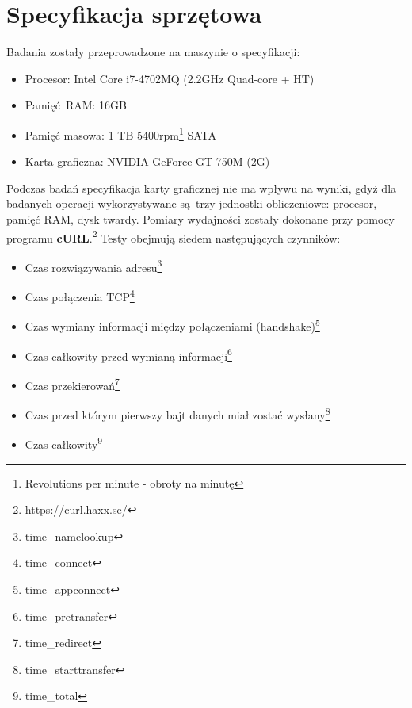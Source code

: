 \section{Specyfikacja sprzętowa}
Badania zostały przeprowadzone na maszynie o specyfikacji:
\begin{itemize}
	\item Procesor: Intel Core i7-4702MQ (2.2GHz Quad-core + HT) 
	\item Pamięć RAM: 16GB
	\item Pamięć masowa: 1 TB 5400rpm\footnote{Revolutions per minute - obroty na minutę} SATA
	\item Karta graficzna: NVIDIA GeForce GT 750M (2G)  
\end{itemize}
Podczas badań specyfikacja karty graficznej nie ma wpływu na wyniki, gdyż dla badanych operacji wykorzystywane są trzy jednostki obliczeniowe: procesor, pamięć RAM, dysk twardy.
\newline Pomiary wydajności zostały dokonane przy pomocy programu \textbf{cURL}.\footnote{\url{https://curl.haxx.se/}} Testy obejmują siedem następujących czynników:
\begin{itemize}\label{items:time-descriptions}
	\item{Czas rozwiązywania adresu\footnote{time\_namelookup}}
	\item{Czas połączenia TCP\footnote{time\_connect}}
	\item{Czas wymiany informacji między połączeniami (handshake)\footnote{time\_appconnect}} 
	\item{Czas całkowity przed wymianą informacji\footnote{time\_pretransfer}}
	\item{Czas przekierowań\footnote{time\_redirect}}
	\item{Czas przed którym pierwszy bajt danych miał zostać wysłany\footnote{time\_starttransfer}}
	\item{Czas całkowity\footnote{time\_total}}
\end{itemize}
